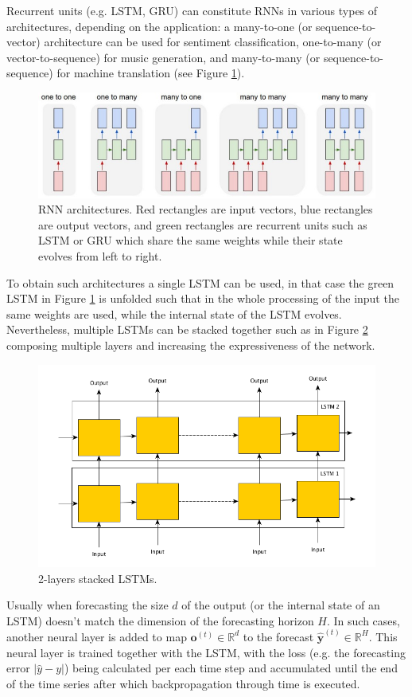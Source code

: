 \documentclass[a4paper, 12pt]{article} %
\begin{document}
	Recurrent units (e.g. LSTM, GRU) can constitute RNNs in various types of architectures, depending on the application: a many-to-one (or sequence-to-vector) architecture can be used for sentiment classification, one-to-many (or vector-to-sequence) for music generation, and many-to-many (or sequence-to-sequence) for machine translation (see Figure \ref{fig:rnn_architectures}).
	\begin{figure}
		\includegraphics[width=\linewidth]{img/rnn_architectures.png}
		\caption{RNN architectures. Red rectangles are input vectors, blue rectangles are output vectors, and green rectangles are recurrent units such as LSTM or GRU which share the same weights while their state evolves from left to right.}
		\label{fig:rnn_architectures}
	\end{figure}

	To obtain such architectures a single LSTM can be used, in that case the green LSTM in Figure \ref{fig:rnn_architectures} is unfolded such that in the whole processing of the input the same weights are used, while the internal state of the LSTM evolves.	Nevertheless, multiple LSTMs can be stacked together such as in Figure \ref{fig:stacked_lstm} composing multiple layers and increasing the expressiveness of the network.
	\begin{figure}
		\includegraphics[width=\linewidth]{img/stacked_lstm.png}
		\caption{2-layers stacked LSTMs. }
		\label{fig:stacked_lstm}
	\end{figure}
	Usually when forecasting the size $d$ of the output (or the internal state of an LSTM) doesn't match the dimension of the forecasting horizon $H$. In such cases, another neural layer is added to map $\pmb{o}^{(t)} \in \mathbb{R}^d$ to the forecast $\hat{\pmb{y}}^{(t)} \in \mathbb{R}^H$. This neural layer is trained together with the LSTM, with the loss (e.g. the forecasting error $|\hat{y} - y|$) being calculated per each time step and accumulated until the end of the time series after which backpropagation through time is executed.
	
\end{document}
